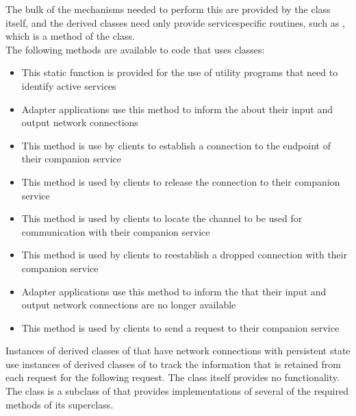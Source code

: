 The bulk of the mechanisms needed to perform this are provided by the
 class itself, and the derived classes need only
provide service\longDash{}specific routines, such as ,
which is a method of the  class.\\

The following methods are available to code that uses
 classes:
\begin{itemize}
\item{} This static function is provided for the use of
utility programs that need to identify active services
\item\exSp{} Adapter applications use this method to inform
the  about their input and output \yarp{}
network connections
\item\exSp{} This method is use by clients to establish a
connection to the endpoint of their companion service
\item\exSp{} This method is used by clients to release the
connection to their companion service
\item\exSp{} This method is used by clients to locate the channel to
be used for communication with their companion service
\item\exSp{} This method is used by clients to
re\longDash{}establish a dropped connection with their companion service
\item\exSp{} Adapter applications use this method to
inform the  that their input and output
\yarp{} network connections are no longer available
\item\exSp{} This method is used by clients to send a request to their
companion service
\end{itemize}
Instances of derived classes of  that have \yarp{}
network connections with persistent state use instances of
derived classes of  to track
the information that is retained from each request for the following request.
The  class itself provides no functionality.
The 
class is a subclass of 
that provides implementations of several of the required methods of its superclass.\\

